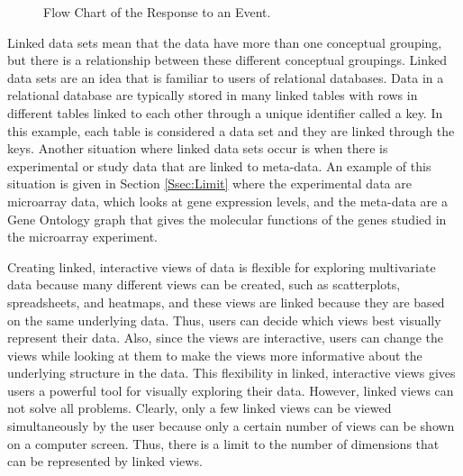 \documentclass{article}[11pt]
\begin{document}

\begin{figure}[!h]
  \begin{center}    
    \caption{ Flow Chart of the Response to an Event. }
    \label{Fig:Event}
  \end{center}
\end{figure}

Linked data sets mean that the data have more than one conceptual grouping,
but there is a relationship between these different conceptual groupings.
Linked data sets are an idea that is familiar to users of relational
databases.  Data in a relational database are typically stored in many
linked tables with rows in different tables linked to each other through a
unique identifier called a key.  In this example, each table is
considered a data set and they are linked through the keys.  Another situation
where linked data sets occur is when there is experimental or study data that
are linked to meta-data.  An example of this situation is given in Section
\ref{Ssec:Limit} where the experimental data are microarray data, which looks
at gene expression levels, and the meta-data are a Gene Ontology graph that
gives the molecular functions of the genes studied in the microarray
experiment.  

Creating linked, interactive views of data is flexible for exploring
multivariate data because many different views can be created, such as
scatterplots, spreadsheets, and heatmaps, and these views are linked because
they are based on the same underlying data.  Thus, users can decide which
views best visually represent their data.  Also, since the views are
interactive, users can change the views while looking at them to make the
views more informative about the underlying structure in the data.  This
flexibility in linked, interactive views gives users a powerful tool for
visually exploring their data.  However, linked views can not solve all
problems.  Clearly, only a few linked views can be viewed simultaneously by
the user because only a certain number of views can be shown on a computer
screen.  Thus, there is a limit to the number of dimensions that can be
represented by linked views. 
\end{document}
